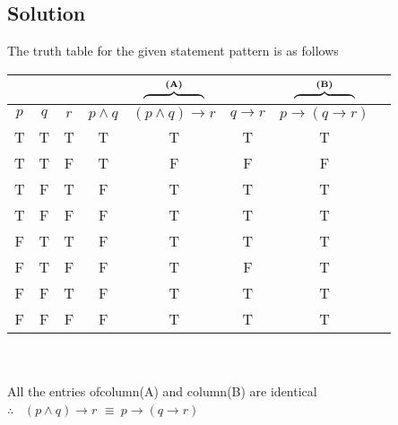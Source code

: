\documentclass[17pt]{extarticle}
\newcommand{\lto}{\mathbin{\to}}
\begin{document}
\begin{fleqn}
\section{Solution}
The truth table for the given statement pattern is as follows \\
\begin{tabular}{|c*{7}{c|}}
\multicolumn{4}{c}{}&
\multicolumn{1}{c}{%
  $\overbrace{\hphantom{(p\land q)\lto p}}^{\textbf{(A)}}$ %
}
&\multicolumn{1}{c}{}&
\multicolumn{1}{c}{%
  $\overbrace{\hphantom{p\lto (p\lor q)}}^{\textbf{(B)}}$%
}\\
\hline
$p$ & $q$ & $r$ & $p\land q$ & $ (p \wedge q) \to r$ & $q\to r$ & $p \to (q \to r)$\\
\hline
 T & T & T & T & T & T & T\\
 T & T & F & T & F & F & F\\
 T & F & T & F & T & T & T\\
 T & F & F & F & T & T & T\\
 F & T & T & F & T & T & T\\
 F & T & F & F & T & F & T\\
 F & F & T & F & T & T & T\\
 F & F & F & F & T & T & T\\
 \hline
\end{tabular} \\ \\
All the entries ofcolumn(A) and column(B) are identical \\
$\therefore$ \ $(p \wedge q) \to r$ $ \equiv \ p \to (q \to r)$ 


\begin{equation} \nonumber
\end{equation}



\end{fleqn}
\end{document}

